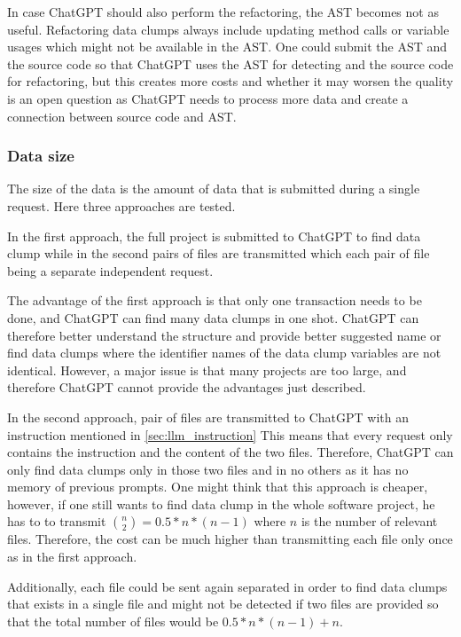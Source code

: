 In case ChatGPT should also perform the refactoring, the \ac{AST} becomes not as useful. Refactoring data clumps always include updating method calls or variable usages which might not be available in the \ac{AST}. One could submit the \ac{AST} and the source code so that ChatGPT uses the \ac{AST} for detecting and the source code for refactoring, but this creates more costs and whether it may worsen the quality is an open question as ChatGPT needs to process more data and create a connection between source code and \ac{AST}.
\subsubsection{Data size}

The size of the data is the amount of data that is submitted during a single request. Here three approaches are tested.

In the first approach, the full project is submitted to ChatGPT to find data clump while in the second pairs of files are transmitted which each pair of file being a separate independent request.

The advantage of the first approach is that only one transaction needs to be done, and ChatGPT can find many data clumps in one shot. ChatGPT can therefore better understand the structure and provide better suggested name or find data clumps where the identifier names of the data clump variables are not identical. However,  a major issue is that many projects are too large, and therefore ChatGPT cannot provide the advantages just described.

In the second approach, pair of files are transmitted to ChatGPT with an instruction mentioned in \ref{sec:llm_instruction}
This means that every request only contains the instruction and the content of the two files. Therefore, ChatGPT can only find data clumps only in those two files and in no others as it has no memory of previous prompts. One might think that this approach is cheaper, however, if one still wants to find data clump in the whole software project, he has to to transmit $\binom{n}{2}=0.5*n*(n-1)$ where $n$ is the number of relevant files. Therefore, the cost can be much higher than transmitting each file only once as in the first approach.

Additionally, each file could be sent again separated in order to find data clumps that exists in a single file and might not be detected if two files are provided so that the total number of files would be $0.5*n*(n-1)+n$.


